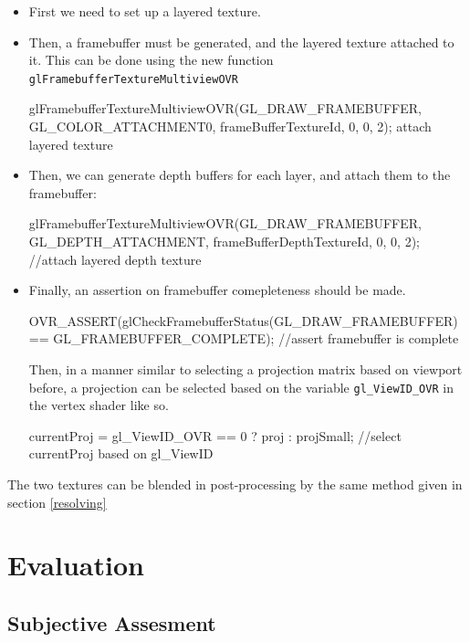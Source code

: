 \documentclass[12pt,a4paper,twoside,openright]{report}
\begin{document}
\begin{itemize}

\item First we need to set up a layered texture.

\item Then, a framebuffer must be generated, and the layered texture attached to it. This can be done using the new function \texttt{glFramebufferTextureMultiviewOVR}
\begin{blockcode}
glFramebufferTextureMultiviewOVR(GL_DRAW_FRAMEBUFFER, GL_COLOR_ATTACHMENT0, frameBufferTextureId, 0, 0, 2); attach layered texture
\end{blockcode}

\item Then, we can generate depth buffers for each layer, and attach them to the framebuffer:
\begin{blockcode}
glFramebufferTextureMultiviewOVR(GL_DRAW_FRAMEBUFFER, GL_DEPTH_ATTACHMENT, frameBufferDepthTextureId, 0, 0, 2); //attach layered depth texture
\end{blockcode}
\item Finally, an assertion on framebuffer comepleteness should be made.
\begin{blockcode}
OVR_ASSERT(glCheckFramebufferStatus(GL_DRAW_FRAMEBUFFER) == GL_FRAMEBUFFER_COMPLETE); //assert framebuffer is complete
\end{blockcode}

Then, in a manner similar to selecting a projection matrix based on viewport before, a projection can be selected based on the variable \texttt{gl\_ViewID\_OVR} in the vertex shader like so.

\begin{blockcode}
currentProj = gl_ViewID_OVR == 0 ? proj : projSmall; //select currentProj based on gl_ViewID 
\end{blockcode}

\end{itemize}

The two textures can be blended in post-processing by the same method given in section \ref{resolving}

\chapter{Evaluation}

\section{Subjective Assesment}
\end{document}
